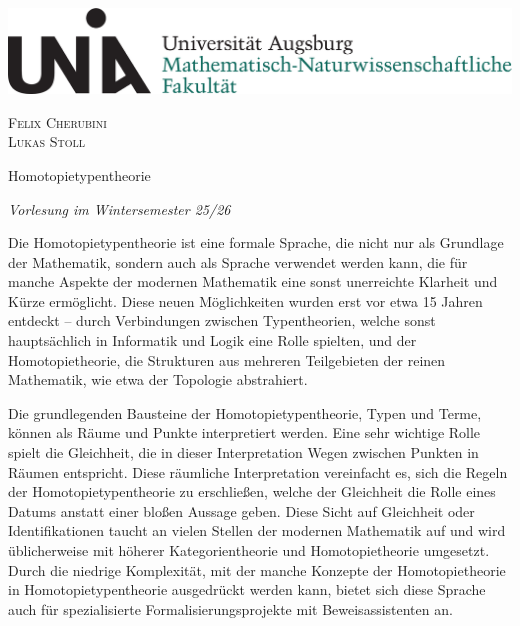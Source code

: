 \documentclass[12pt]{scrarticle}
\begin{document}
\begin{center}
  \begin{minipage}{0.6\textwidth}
  \includegraphics[width=\textwidth]{img/unilogo_mntf.pdf}
  \vspace{0pt}
  \end{minipage}
  \hfill
  \begin{minipage}{0.38\textwidth}
  \raggedleft
  \textsc{Felix Cherubini\\Lukas Stoll}
  \end{minipage}
\end{center}

\begin{center}
  \vspace{2em}
  {\Huge Homotopietypentheorie \par}
  \vspace{1em}
  {\large\itshape Vorlesung im Wintersemester 25/26 \par}
  \vspace{2em}
\end{center}

Die Homotopietypentheorie ist eine formale Sprache, die nicht nur als Grundlage der Mathematik, sondern auch als Sprache verwendet werden kann, die für manche Aspekte der modernen Mathematik eine sonst unerreichte Klarheit und Kürze ermöglicht.
Diese neuen Möglichkeiten wurden erst vor etwa 15 Jahren entdeckt -- durch Verbindungen zwischen Typentheorien, welche sonst hauptsächlich in Informatik und Logik eine Rolle spielten, und der Homotopietheorie, die Strukturen aus mehreren Teilgebieten der reinen Mathematik, wie etwa der Topologie abstrahiert.

\vspace{1em}

Die grundlegenden Bausteine der Homotopietypentheorie, Typen und Terme, können als Räume und Punkte interpretiert werden.
Eine sehr wichtige Rolle spielt die Gleichheit, die in dieser Interpretation Wegen zwischen Punkten in Räumen entspricht.
Diese räumliche Interpretation vereinfacht es, sich die Regeln der Homotopietypentheorie zu erschließen, welche der Gleichheit die Rolle eines Datums anstatt einer bloßen Aussage geben.
Diese Sicht auf Gleichheit oder Identifikationen taucht an vielen Stellen der modernen Mathematik auf und wird üblicherweise mit höherer Kategorientheorie und Homotopietheorie umgesetzt.
Durch die niedrige Komplexität, mit der manche Konzepte der Homotopietheorie in Homotopietypentheorie ausgedrückt werden kann, bietet sich diese Sprache auch für spezialisierte Formalisierungsprojekte mit Beweisassistenten an.
\end{document}
